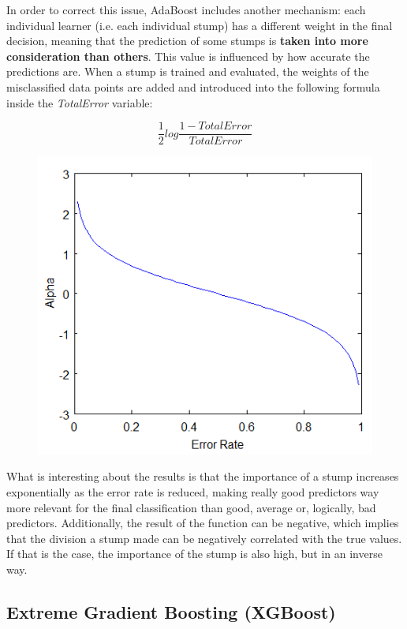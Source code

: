 \documentclass{article}
\begin{document}
In order to correct this issue, AdaBoost includes another mechanism: each individual learner (i.e. each individual stump) has a different weight in the final decision, meaning that the prediction of some stumps is \textbf{taken into more consideration than others}. This value is influenced by how accurate the predictions are. When a stump is trained and evaluated, the weights of the misclassified data points are added and introduced into the following formula inside the \textit{TotalError} variable:

\[\frac{1}{2} log \frac{1 - TotalError}{TotalError}\]

\begin{figure}
\includegraphics[scale=0.6]{plot.png}
\centering
\end{figure}

What is interesting about the results is that the importance of a stump increases exponentially as the error rate is reduced, making really good predictors way more relevant for the final classification than good, average or, logically, bad predictors. Additionally, the result of the function can be negative, which implies that the division a stump made can be negatively correlated with the true values. If that is the case, the importance of the stump is also high, but in an inverse way.

\subsection{Extreme Gradient Boosting (XGBoost)}
\end{document}
